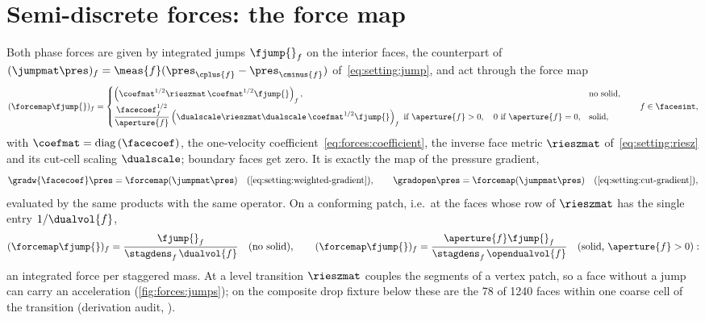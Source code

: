 \section{Semi-discrete forces: the force map}\label{sec:forces:map}
Both phase forces are given by integrated jumps $\fjump{}_f$ on the interior
faces, the counterpart of $(\jumpmat\pres)_f=\meas{f}(\pres_{\cplus{f}}-\pres_{\cminus{f}})$
of~\cref{eq:setting:jump}, and act through the force map
\begin{equation}\label{eq:forces:map}
  (\forcemap\fjump{})_f=\begin{cases}
    \roundpar{\coefmat^{1/2}\rieszmat\,\coefmat^{1/2}\fjump{}}_f, & \text{no solid},\\[2pt]
    \dfrac{\facecoef_f^{1/2}}{\aperture{f}}\roundpar{\dualscale\rieszmat\dualscale\,\coefmat^{1/2}\fjump{}}_f
      \ \text{if }\aperture{f}>0,\quad 0\ \text{if }\aperture{f}=0, & \text{solid},
  \end{cases}
  \qquad f\in\facesint,
\end{equation}
with $\coefmat=\diag{\facecoef}$, the one-velocity
coefficient~\cref{eq:forces:coefficient}, the inverse face metric
$\rieszmat$ of~\cref{eq:setting:riesz} and its cut-cell scaling $\dualscale$;
boundary faces get zero. It is exactly the map of the pressure gradient,
\begin{equation}\label{eq:forces:map-gradient}
  \gradw{\facecoef}\pres=\forcemap(\jumpmat\pres)\quad\text{(\cref{eq:setting:weighted-gradient})},
  \qquad
  \gradopen\pres=\forcemap(\jumpmat\pres)\quad\text{(\cref{eq:setting:cut-gradient})},
\end{equation}
evaluated by the same products with the same operator. On a conforming
patch, i.e.\ at the faces whose row of $\rieszmat$ has the single entry
$1/\dualvol{f}$,
\begin{equation}\label{eq:forces:conforming}
  (\forcemap\fjump{})_f=\frac{\fjump{}_f}{\stagdens_f\,\dualvol{f}}\quad\text{(no solid)},\qquad
  (\forcemap\fjump{})_f=\frac{\aperture{f}\fjump{}_f}{\stagdens_f\,\opendualvol{f}}\quad\text{(solid, }\aperture{f}>0\text{)} :
\end{equation}
an integrated force per staggered mass. At a level transition $\rieszmat$
couples the segments of a vertex patch, so a face without a jump can carry
an acceleration (\cref{fig:forces:jumps}); on the composite drop fixture
below these are the 78 of 1240 faces within one coarse cell of the
transition (derivation audit, ).

